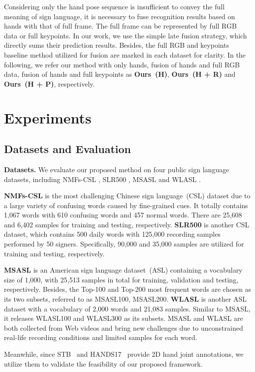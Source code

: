 \documentclass[10pt,twocolumn,letterpaper]{article}
\begin{document}
Considering only the hand pose sequence is insufficient to convey the full meaning of sign language, it is necessary to fuse recognition results based on hands with that of full frame.
The full frame can be represented by full RGB data or full keypoints. 
In our work, we use the simple late fusion strategy, which directly sums their prediction results.
Besides, the full RGB and keypoints baseline method utilized for fusion are marked in each dataset for clarity.
In the following, we refer our method with only hands, fusion of hands and full RGB data, fusion of hands and full keypoints as \textbf{Ours~(H)}, \textbf{Ours~(H + R)} and \textbf{Ours~(H + P)}, respectively.


\section{Experiments}
\subsection{Datasets and Evaluation}
\noindent
\textbf{Datasets.} 
We evaluate our proposed method on four public sign language datasets, including NMFs-CSL \cite{hu2020global}, SLR500 \cite{huang2018attention}, MSASL \cite{joze2018ms} and WLASL \cite{li2020word}. 

\textbf{NMFs-CSL} is the most challenging Chinese sign language~(CSL) dataset due to a large variety of confusing words caused by fine-grained cues. 
It totally contains 1,067 words with 610 confusing words and 457 normal words. 
There are 25,608 and 6,402 samples for training and testing, respectively.
\textbf{SLR500} is another CSL dataset, which contains 500 daily words with 125,000 recording samples performed by 50 signers. 
Specifically, 90,000 and 35,000 samples are utilized for training and testing, respectively.

\textbf{MSASL} is an American sign language dataset~(ASL) containing a vocabulary size of 1,000, with 25,513 samples in total for training, validation and testing, respectively. 
Besides, the Top-100 and Top-200 most frequent words are chosen as its two subsets, referred to as MSASL100, MSASL200.
\textbf{WLASL} is another ASL dataset with a vocabulary of 2,000 words and 21,083 samples.
Similar to MSASL, it releases WLASL100 and WLASL300 as its subsets.
MSASL and WLASL are both collected from Web videos and bring new challenges due to unconstrained real-life recording conditions and limited samples for each word.

Meanwhile, since STB~\cite{zhang2017hand} and HANDS17~\cite{yuan20172017} provide 2D hand joint annotations, we utilize them to validate the feasibility of our proposed framework.
\end{document}
